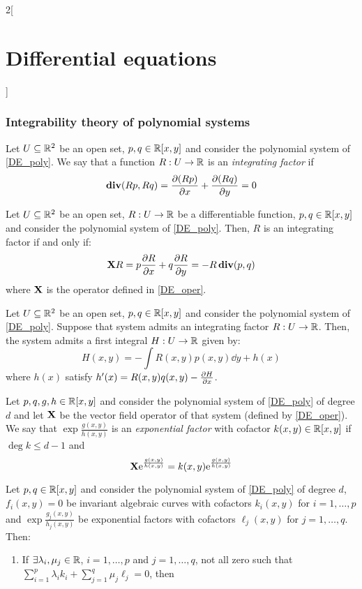 \documentclass[../../../main.tex]{subfiles}
\begin{document}
\begin{multicols}{2}[\section{Differential equations}]
  \subsubsection{Integrability theory of polynomial systems}
  \begin{definition}
    Let $U\subseteq\mathbb{R}^2$ be an open set, $p,q\in\mathbb{R}[x,y]$ and consider the polynomial system of \cref{DE_poly}. We say that a function $R:U\rightarrow\mathbb{R}$ is an \emph{integrating factor} if $$\operatorname{\boldsymbol{\mathrm{div}}} (Rp,Rq)=\pdv{(Rp)}{x}+\pdv{(Rq)}{y}=0$$
  \end{definition}
  \begin{proposition}
    Let $U\subseteq\mathbb{R}^2$ be an open set, $R:U\rightarrow\mathbb{R}$ be a differentiable function, $p,q\in\mathbb{R}[x,y]$ and consider the polynomial system of \cref{DE_poly}. Then, $R$ is an integrating factor if and only if: $$\boldsymbol{\mathrm{X}}R=p\pdv{R}{x}+q\pdv{R}{y}=-R\operatorname{\boldsymbol{\mathrm{div}}}(p,q)$$
    where $\boldsymbol{\mathrm{X}}$ is the operator defined in \cref{DE_oper}.
  \end{proposition}
  \begin{proposition}\label{DE_intfactor}
    Let $U\subseteq\mathbb{R}^2$ be an open set, $p,q\in\mathbb{R}[x,y]$ and consider the polynomial system of \cref{DE_poly}. Suppose that system admits an integrating factor $R:U\rightarrow\mathbb{R}$. Then, the system admits a first integral $H:U\rightarrow\mathbb{R}$ given by:
    $$H(x,y)=-\int R(x,y)p(x,y)\dd{y}+h(x)$$
    where $h(x)$ satisfy $h'(x)=R(x,y)q(x,y)-\pdv{H}{x}(x,y)$.
  \end{proposition}
  \begin{definition}
    Let $p,q,g,h\in\mathbb{R}[x,y]$ and consider the polynomial system of \cref{DE_poly} of degree $d$ and let $\boldsymbol{\mathrm{X}}$ be the vector field operator of that system (defined by \cref{DE_oper}). We say that $\exp{\frac{g(x,y)}{h(x,y)}}$ is an \emph{exponential factor} with cofactor $k(x,y)\in\mathbb{R}[x,y]$ if $\deg k\leq d-1$ and $$\boldsymbol{\mathrm{X}}\mathrm{e}^{\frac{g(x,y)}{h(x,y)}}=k(x,y)\mathrm{e}^{\frac{g(x,y)}{h(x,y)}}$$
  \end{definition}
  \begin{theorem}
    Let $p,q\in\mathbb{R}[x,y]$ and consider the polynomial system of \cref{DE_poly} of degree $d$, $f_i(x,y)=0$ be invariant algebraic curves with cofactors $k_i(x,y)$ for $i=1,\ldots,p$ and $\exp{\frac{g_j(x,y)}{h_j(x,y)}}$ be exponential factors with cofactors $\ell_j(x,y)$ for $j=1,\ldots,q$. Then:
    \begin{enumerate}
      \item If $\exists \lambda_i,\mu_j\in\mathbb{R}$, $i=1,\ldots,p$ and $j=1,\ldots,q$, not all zero such that $\sum_{i=1}^p\lambda_ik_i+\sum_{j=1}^q\mu_j\ell_j=0$, then

\end{enumerate}
\end{theorem}
\end{multicols}
\end{document}
